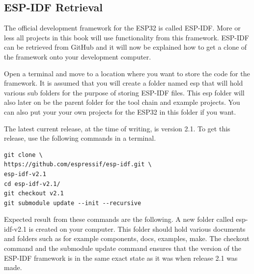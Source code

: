 \documentclass{tufte-book}
\begin{document}
\subsection{ESP-IDF Retrieval}


The official development framework for the ESP32 is called ESP-IDF. More or less all projects in this book will use functionality from this framework. ESP-IDF can be retrieved from GitHub and it will now be explained how to get a clone of the framework onto your development computer.

Open a terminal and move to a location where you want to store the code for the framework. It is assumed that you will create a folder named esp that will hold various sub folders for the purpose of storing ESP-IDF files. This esp folder will also later on be the parent folder for the tool chain and example projects. You can also put your your own projects for the ESP32 in this folder if you want.


The latest current release, at the time of writing, is version 2.1. To get this release, use the following commands in a terminal.

\begin{lstlisting}
git clone \
https://github.com/espressif/esp-idf.git \
esp-idf-v2.1
cd esp-idf-v2.1/
git checkout v2.1
git submodule update --init --recursive
\end{lstlisting}


Expected result from these commands are the following. A new folder called esp-idf-v2.1 is created on your computer. This folder should hold various documents and folders such as for example components, docs, examples, make. The checkout command and the submodule update command ensures that the version of the ESP-IDF framework is in the same exact state as it was when release 2.1 was made.
\end{document}
